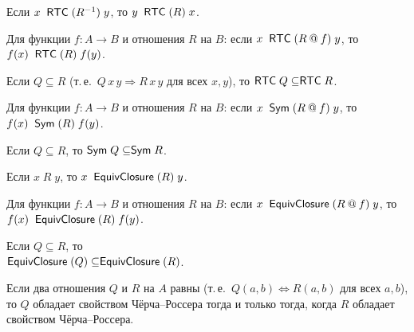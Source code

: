 \begin{lemma}
Если $x\;\mathrel{\mathsf{RTC}}(R^{-1})\;y$, то $y\;\mathrel{\mathsf{RTC}}(R)\;x$.
\end{lemma}

\begin{lemma}
Для функции $f : A \to B$ и отношения $R$ на $B$: если
$x\;\mathrel{\mathsf{RTC}}(R \mathbin{@} f)\;y$, то $f(x)\;\mathrel{\mathsf{RTC}}(R)\;f(y)$.
\end{lemma}

\begin{lemma}
Если $Q \subseteq R$ (т.\,е.~$Q\,x\,y \Rightarrow R\,x\,y$ для всех
$x, y$), то $\mathrel{\mathsf{RTC}} Q \subseteq \mathrel{\mathsf{RTC}} R$.
\end{lemma}

\begin{lemma}
Для функции $f : A \to B$ и отношения $R$ на $B$: если
$x\;\mathrel{\mathsf{Sym}}(R \mathbin{@} f)\;y$, то $f(x)\;\mathrel{\mathsf{Sym}}(R)\;f(y)$.
\end{lemma}

\begin{lemma}
Если $Q \subseteq R$, то $\mathrel{\mathsf{Sym}} Q \subseteq \mathrel{\mathsf{Sym}} R$.
\end{lemma}

\begin{lemma}
Если $x\;R\;y$, то $x\;\mathrel{\mathsf{EquivClosure}}(R)\;y$.
\end{lemma}

\begin{lemma}
Для функции $f : A \to B$ и отношения $R$ на $B$: если
$x\;\mathrel{\mathsf{EquivClosure}}(R \mathbin{@} f)\;y$, то
$f(x)\;\mathrel{\mathsf{EquivClosure}}(R)\;f(y)$.
\end{lemma}

\begin{lemma}
Если $Q \subseteq R$, то \\
$\mathrel{\mathsf{EquivClosure}}(Q) \subseteq \mathrel{\mathsf{EquivClosure}}(R)$.
\end{lemma}

\begin{lemma}
Если два отношения $Q$ и $R$ на $A$ равны
(т.\,е.~$Q(a,b) \Leftrightarrow R(a,b)$ для всех $a, b$), то $Q$
обладает свойством Чёрча--Россера тогда и только тогда,
когда $R$ обладает свойством Чёрча--Россера.
\end{lemma}

